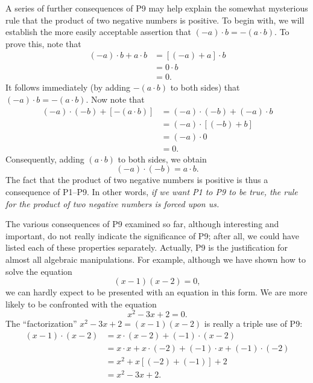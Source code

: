 A series of further consequences of P9 may help explain the somewhat
mysterious rule that the product of two negative numbers is positive. To
begin with, we will establish the more easily acceptable assertion that
$(-a) \cdot b = -(a \cdot b)$. To prove this, note that
\begin{align*}
(-a) \cdot b + a \cdot b &= [(-a)+a] \cdot b\\
&= 0 \cdot b\\
&= 0.
\end{align*}
It follows immediately (by adding $-(a \cdot b)$ to both sides) that
$(-a) \cdot b = -(a \cdot b)$. Now note that
\begin{align*}
(-a) \cdot (-b) + [-(a \cdot b)] &= (-a) \cdot (-b) + (-a) \cdot b\\
&= (-a) \cdot [(-b) + b]\\
&= (-a) \cdot 0\\
&= 0.
\end{align*}
Consequently, adding $(a \cdot b)$ to both sides, we obtain
\[ (-a) \cdot (-b) = a \cdot b. \]
The fact that the product of two negative numbers is positive is thus a
consequence of P1--P9. In other words, \emph{if we want P1 to P9 to be true,
the rule for the product of two negative numbers is forced upon us.}

The various consequences of P9 examined so far, although interesting and
important, do not really indicate the significance of P9; after all, we could
have listed each of these properties separately. Actually, P9 is the
justification for almost all algebraic manipulations. For example, although
we have shown how to solve the equation
\[ (x-1)(x-2) = 0, \]
we can hardly expect to be presented with an equation in this form. We are
more likely to be confronted with the equation
\[ x^2 - 3x + 2 = 0. \]
The ``factorization'' $x^2 - 3x + 2 = (x-1)(x-2)$ is really a triple use of P9:
\begin{align*}
(x-1) \cdot (x-2) &= x \cdot (x-2) + (-1) \cdot (x-2)\\
&= x \cdot x + x \cdot (-2) + (-1) \cdot x + (-1) \cdot (-2)\\
&= x^2 + x[(-2)+(-1)] + 2\\
&= x^2 - 3x + 2.
\end{align*}

